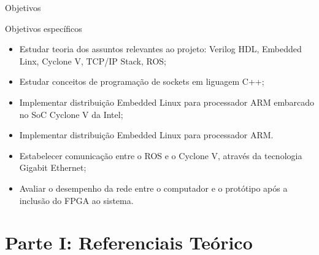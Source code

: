 \documentclass[10pt]{beamer}
\begin{document}
\begin{frame}{Objetivos}
	\begin{alertblock}{Objetivos específicos}
        \begin{itemize}
        	\item Estudar teoria dos assuntos relevantes ao projeto: Verilog HDL, Embedded Linx,
			Cyclone V, TCP/IP Stack, ROS;
        	\item Estudar conceitos de programação de sockets em liguagem C++;
        	\item Implementar distribuição Embedded Linux para processador ARM embarcado no
			SoC Cyclone V da Intel;
        	\item Implementar distribuição Embedded Linux para processador ARM.
        	\item Estabelecer comunicação entre o ROS e o Cyclone V, através da tecnologia Gigabit
			Ethernet;
        	\item Avaliar o desempenho da rede entre o computador e o protótipo após a inclusão do
			FPGA ao sistema.
        \end{itemize}
	\end{alertblock}
\end{frame}


\section{Parte I: Referenciais Teórico}

\end{document}

